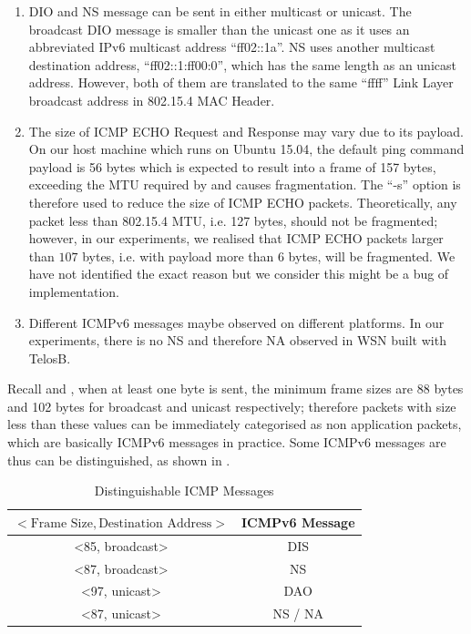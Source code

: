 \begin{enumerate}
	\item DIO and NS message can be sent in either multicast or unicast. The broadcast DIO message is smaller than the unicast one as it uses an abbreviated IPv6 multicast address ``ff02::1a''. NS uses another multicast destination address, ``ff02::1:ff00:0'', which has the same length as an unicast address. However, both of them are translated to the same ``ffff'' Link Layer broadcast address in 802.15.4 MAC Header.
	\item The size of ICMP ECHO Request and Response may vary due to its payload. On our host machine which runs on Ubuntu 15.04, the default ping command payload is 56 bytes which is expected to result into a frame of 157 bytes, exceeding the MTU required by \cite{802154} and causes fragmentation. The ``-s'' option is therefore used to reduce the size of ICMP ECHO packets. Theoretically, any packet less than 802.15.4 MTU, i.e. 127 bytes, should not be fragmented; however, in our experiments, we realised that ICMP ECHO packets larger than $107$ bytes, i.e. with payload more than $6$ bytes, will be fragmented. We have not identified the exact reason but we consider this might be a bug of implementation.
	\item Different ICMPv6 messages maybe observed on different platforms. In our experiments, there is no NS and therefore NA observed in WSN built with TelosB.
\end{enumerate}

Recall  and , when at least one byte is sent, the minimum frame sizes are 88 bytes and 102 bytes for broadcast and unicast respectively; therefore packets with size less than these values can be immediately categorised as non application packets, which are basically ICMPv6 messages in practice. Some ICMPv6 messages are thus can be distinguished, as shown in .

\begin{table}[ht!]
	\centering
	\begin{tabular}{|c|c|}
		\hline
		$<\text{Frame Size}, \text{Destination Address}>$                     & ICMPv6 Message \\ \hline
		\textless85, broadcast\textgreater & DIS            \\ \hline
		\textless87, broadcast\textgreater & NS             \\ \hline
		\textless97, unicast\textgreater   & DAO            \\ \hline
		\textless87, unicast\textgreater   & NS / NA        \\ \hline
	\end{tabular}
	\caption{Distinguishable ICMP Messages}
	\label{Tbl: Distinguishable ICMP Messages}
\end{table}

